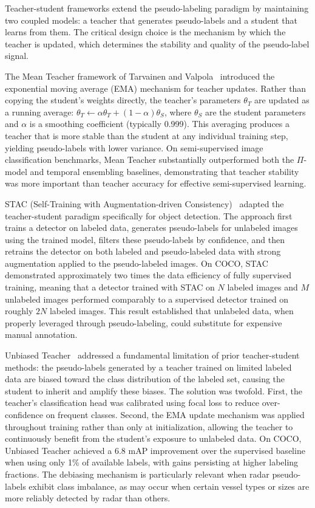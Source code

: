 Teacher-student frameworks extend the pseudo-labeling paradigm by maintaining two coupled models: a teacher that generates pseudo-labels and a student that learns from them. The critical design choice is the mechanism by which the teacher is updated, which determines the stability and quality of the pseudo-label signal.

The Mean Teacher framework of Tarvainen and Valpola~\cite{tarvainen2017mean} introduced the exponential moving average (EMA) mechanism for teacher updates. Rather than copying the student's weights directly, the teacher's parameters $\theta_T$ are updated as a running average: $\theta_T \leftarrow \alpha \theta_T + (1-\alpha) \theta_S$, where $\theta_S$ are the student parameters and $\alpha$ is a smoothing coefficient (typically 0.999). This averaging produces a teacher that is more stable than the student at any individual training step, yielding pseudo-labels with lower variance. On semi-supervised image classification benchmarks, Mean Teacher substantially outperformed both the $\Pi$-model and temporal ensembling baselines, demonstrating that teacher stability was more important than teacher accuracy for effective semi-supervised learning.

STAC (Self-Training with Augmentation-driven Consistency)~\cite{sohn2020stac} adapted the teacher-student paradigm specifically for object detection. The approach first trains a detector on labeled data, generates pseudo-labels for unlabeled images using the trained model, filters these pseudo-labels by confidence, and then retrains the detector on both labeled and pseudo-labeled data with strong augmentation applied to the pseudo-labeled images. On COCO, STAC demonstrated approximately two times the data efficiency of fully supervised training, meaning that a detector trained with STAC on $N$ labeled images and $M$ unlabeled images performed comparably to a supervised detector trained on roughly $2N$ labeled images. This result established that unlabeled data, when properly leveraged through pseudo-labeling, could substitute for expensive manual annotation.

Unbiased Teacher~\cite{liu2021unbiased} addressed a fundamental limitation of prior teacher-student methods: the pseudo-labels generated by a teacher trained on limited labeled data are biased toward the class distribution of the labeled set, causing the student to inherit and amplify these biases. The solution was twofold. First, the teacher's classification head was calibrated using focal loss to reduce over-confidence on frequent classes. Second, the EMA update mechanism was applied throughout training rather than only at initialization, allowing the teacher to continuously benefit from the student's exposure to unlabeled data. On COCO, Unbiased Teacher achieved a 6.8 mAP improvement over the supervised baseline when using only 1\% of available labels, with gains persisting at higher labeling fractions. The debiasing mechanism is particularly relevant when radar pseudo-labels exhibit class imbalance, as may occur when certain vessel types or sizes are more reliably detected by radar than others.

